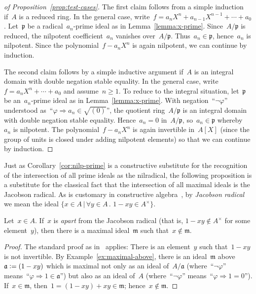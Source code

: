 \documentclass[envcountsect,envcountsame,runningheads]{llncs}
\newcommand{\aaa}{\mathfrak{a}}
\newcommand{\mmm}{\mathfrak{m}}
\newcommand{\ppp}{\mathfrak{p}}
\newcommand{\defeq}{\vcentcolon=}
\renewcommand{\_}{\mathpunct{.}\,}
\begin{document}
\begin{proof}[of Proposition~\ref{prop:test-cases}]
The first claim follows from a simple induction if~$A$ is a reduced
ring.
%
In the general case, write~$f = a_n X^n + a_{n-1} X^{n-1} + \cdots + a_0$. Let~$\ppp$
be a radical~$a_n$-prime ideal as in Lemma~\ref{lemma:x-prime}. Since~$A/\ppp$
is reduced, the nilpotent coefficient~$a_n$ vanishes over~$A/\ppp$. Thus~$a_n \in \ppp$,
hence~$a_n$ is nilpotent. Since the polynomial~$f - a_n X^n$ is again
nilpotent, we can continue by induction.

The second claim follows by a simple inductive argument if~$A$ is an
integral domain with double negation stable equality.
%
In the general case, write~$f = a_n X^n + \cdots + a_0$
and assume~$n \geq 1$. To reduce to the integral situation, let~$\ppp$ be
an~$a_n$-prime ideal as in Lemma~\ref{lemma:x-prime}.
With negation~``$\neg\varphi$'' understood as~``$\varphi \Rightarrow a_n \in
\sqrt{(0)}$'', the quotient ring~$A/\ppp$ is an integral domain with double
negation stable equality.
Hence~$a_n = 0$ in~$A/\ppp$, so~$a_n \in \ppp$ whereby~$a_n$ is nilpotent. The
polynomial~$f - a_n X^n$ is again invertible in~$A[X]$ (since the group of
units is closed under adding nilpotent elements) so that we can continue by
induction.
\end{proof}

Just as Corollary~\ref{cor:nilp-prime} is a constructive substitute
for the recognition of the intersection of all prime ideals as the nilradical,
the following proposition is a substitute for the classical fact that
the intersection of all maximal ideals is the Jacobson radical.
%
As is customary in constructive
algebra~\cite[Section~IX.1]{lombardi-quitte:constructive-algebra}, by
\emph{Jacobson radical} we mean the ideal
$\{ x \in A \,|\, \forall y \in A\_ 1 - xy \in A^\times \}$.

\begin{proposition}Let~$x \in A$. If~$x$ is \emph{apart} from the Jacobson radical (that is, $1-xy \not\in A^\times$ for some element~$y$), then
there is a maximal ideal~$\mmm$ such that~$x \not\in \mmm$.
\end{proposition}

\begin{proof}The standard proof as
in~\cite[Lemma~IX.1.1]{lombardi-quitte:constructive-algebra} applies: There is
an element~$y$ such that~$1-xy$
is not invertible. By Example~\ref{ex:maximal-above}, there is an ideal~$\mmm$
above~$\aaa \defeq (1-xy)$ which is maximal not only as an ideal of~$A/\aaa$
(where~``$\neg\varphi$'' means~``$\varphi \Rightarrow 1 \in \aaa$'') but also as an
ideal of~$A$ (where~``$\neg\varphi$'' means~``$\varphi \Rightarrow 1 = 0$''). If~$x
\in \mmm$, then~$1 = (1-xy) + xy \in \mmm$; hence~$x \not\in \mmm$.
\end{proof}
\end{document}
